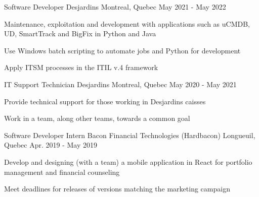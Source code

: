 

\begin{cventries}

  
  \cventry
    {Software Developer} %
    {Desjardins} %
    {Montreal, Quebec} %
    {May 2021 - May 2022} %
    {
      \begin{cvitems} %
        \item {Maintenance, exploitation and development with applications such as uCMDB, UD, SmartTrack and BigFix in Python and Java}
        \item {Use Windows batch scripting to automate jobs and Python for development}
        \item {Apply ITSM processes in the ITIL v.4 framework}
      \end{cvitems}
    }
    
  \cventry
    {IT Support Technician} %
    {Desjardins} %
    {Montreal, Quebec} %
    {May 2020 - May 2021} %
    {
      \begin{cvitems} %
        \item {Provide technical support for those working in Desjardins caisses}
        \item {Work in a team, along other teams, towards a common goal}
      \end{cvitems}
    }
    
  \cventry
    {Software Developer Intern} %
    {Bacon Financial Technologies (Hardbacon)} %
    {Longueuil, Quebec} %
    {Apr. 2019 - May 2019} %
    {
      \begin{cvitems} %
        \item {Develop and designing (with a team) a mobile application in React for portfolio management and financial counseling}
        \item {Meet deadlines for releases of versions matching the marketing campaign}
      \end{cvitems}
    }

\end{cventries}
